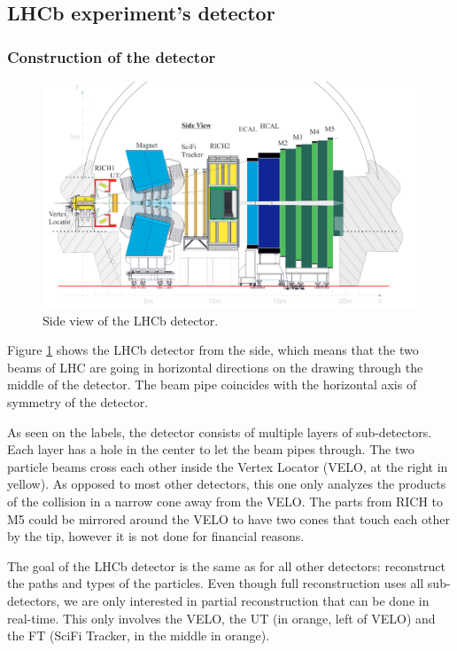 \documentclass[12pt]{article}
\begin{document}
\subsection{LHCb experiment's detector}\label{sec_lhcb_detector}
	

\subsubsection{Construction of the detector}\label{sec_lhcb_det_constr}

\begin{figure}[H]
	\includegraphics[width=\textwidth]{lhcb_geometry_upgrade}
	\caption{Side view of the LHCb detector.}
	\label{fig_lhcb_geometry}
\end{figure}

Figure \ref{fig_lhcb_geometry} shows the LHCb detector from the side, which means that the two beams of LHC are going in horizontal directions on the drawing through the middle of the detector. The beam pipe coincides with the horizontal axis of symmetry of the detector.

As seen on the labels, the detector consists of multiple layers of sub-detectors. Each layer has a hole in the center to let the beam pipes through. The two particle beams cross each other inside the Vertex Locator (VELO, at the right in yellow). As opposed to most other detectors, this one only analyzes the products of the collision in a narrow cone away from the VELO. The parts from RICH to M5 could be mirrored around the VELO to have two cones that touch each other by the tip, however it is not done for financial reasons.

The goal of the LHCb detector is the same as for all other detectors: reconstruct the paths and types of the particles. Even though full reconstruction uses all sub-detectors, we are only interested in partial reconstruction that can be done in real-time. This only involves the VELO, the UT (in orange, left of VELO) and the FT (SciFi Tracker, in the middle in orange).
\end{document}
